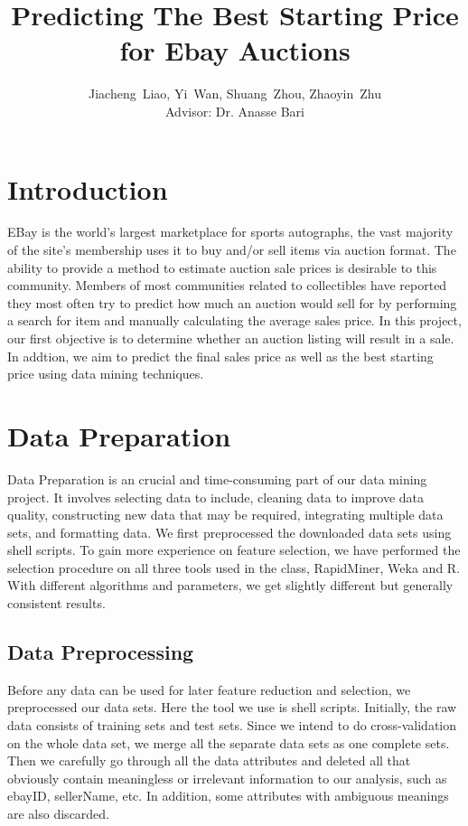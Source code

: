 \documentclass[CEJM,PDF]{cej} %
\title{Predicting The Best Starting Price for Ebay Auctions}
\author{Jiacheng~Liao\inst{1},
        Yi~Wan\inst{1},
        Shuang~Zhou\inst{1},
        Zhaoyin~Zhu\inst{2}\\
        Advisor: Dr. Anasse Bari\inst{1}
       }
\institute{\inst{1}
           Department of Computer Science, New York University, New York, NY 10012, USA
           \inst{2}
           Division of Biostatistics, NYU School of Medicine, New York, NY 10016, USA
          }
\begin{document}
\maketitle

\section{Introduction}

EBay is the world’s largest marketplace for sports autographs, the vast majority of the site’s membership uses it to buy and/or sell items via auction format. The ability to provide a method to estimate auction sale prices is desirable to this community. Members of most communities related to collectibles have reported they most often try to predict how much an auction would sell for by performing a search for item and manually calculating the average sales price. In this project, our first objective is to determine whether an auction listing will result in a sale. In addtion, we aim to predict the final sales price as well as the best starting price using data mining techniques.


\section{Data Preparation}

Data Preparation is an crucial and time-consuming part of our data mining project. It involves selecting data to include, cleaning data to improve data quality, constructing new data that may be required, integrating multiple data sets, and formatting data. We first preprocessed the downloaded data sets using shell scripts. To gain more experience on feature selection, we have performed the selection procedure on all three tools used in the class, RapidMiner, Weka and R. With different algorithms and parameters, we get slightly different but generally consistent results. 

\subsection{Data Preprocessing}
Before any data can be used for later feature reduction and selection, we preprocessed our data sets. Here the tool we use is shell scripts. Initially, the raw data consists of training sets and test sets. Since we intend to do cross-validation on the whole data set, we merge all the separate data sets as one complete sets. Then we carefully go through all the data attributes and deleted all that obviously contain meaningless or irrelevant information to our analysis, such as ebayID, sellerName, etc. In addition, some attributes with ambiguous meanings are also discarded. 
\end{document}
